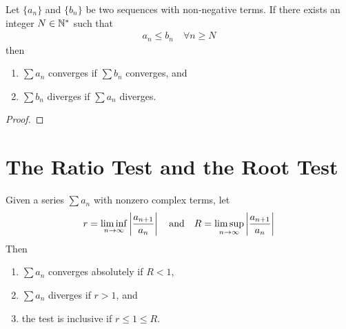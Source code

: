 \documentclass[thmcnt=section, 12pt]{my-elegantbook}
\begin{document}

\begin{theorem} \label{thm:52}
    Let $\{a_n\}$ and $\{b_n\}$ be two sequences with non-negative terms. If there exists an integer $N \in \mathbb{N}^\ast$ such that 
    \begin{align*}
        a_n \leq b_n
        \quad \forall n \geq N
    \end{align*}
    then 
    \begin{enumerate}
        \item $\sum a_n$ converges if $\sum b_n$ converges, and 
        \item $\sum b_n$ diverges if $\sum a_n$ diverges.
    \end{enumerate}
\end{theorem}

\begin{proof}
\end{proof}


\section{The Ratio Test and the Root Test}


\begin{theorem} \label{thm:54}
    Given a series $\sum a_n$ with nonzero complex terms, let 
    \begin{align*}
        r = \liminf_{n \to \infty} \left\lvert \frac{a_{n+1}}{a_n} \right\rvert
        \quad \text{and} \quad
        R = \limsup_{n \to \infty} \left\lvert \frac{a_{n+1}}{a_n} \right\rvert
    \end{align*}
    Then 
    \begin{enumerate}
        \item $\sum a_n$ converges absolutely if $R < 1$,
        \item $\sum a_n$ diverges if $r > 1$, and
        \item the test is inclusive if $r \leq 1 \leq R$.
    \end{enumerate}
\end{theorem}
\end{document}
